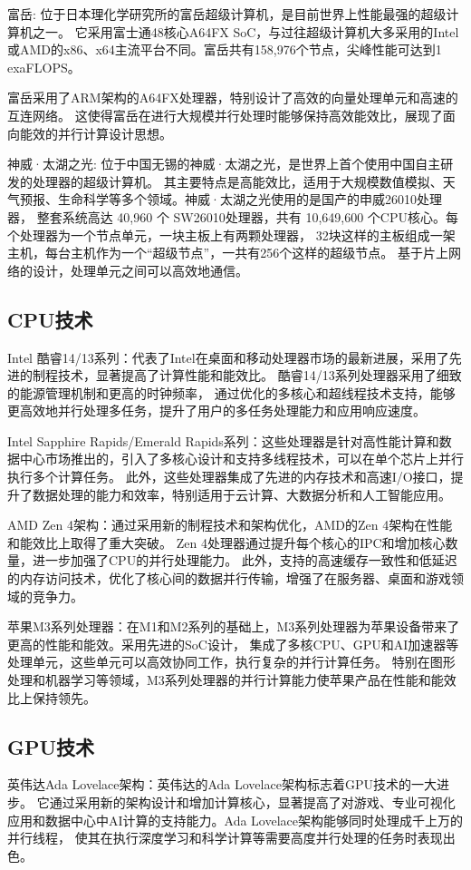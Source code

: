 \documentclass{ctexart}
\begin{document}
富岳: 位于日本理化学研究所的富岳超级计算机，是目前世界上性能最强的超级计算机之一。
它采用富士通48核心A64FX SoC，与过往超级计算机大多采用的Intel或AMD的x86、x64主流平台不同。富岳共有158,976个节点，尖峰性能可达到1 exaFLOPS。\cite{fugaku1}

富岳采用了ARM架构的A64FX处理器，特别设计了高效的向量处理单元和高速的互连网络。
这使得富岳在进行大规模并行处理时能够保持高效能效比，展现了面向能效的并行计算设计思想。

神威·太湖之光: 位于中国无锡的神威·太湖之光，是世界上首个使用中国自主研发的处理器的超级计算机。
其主要特点是高能效比，适用于大规模数值模拟、天气预报、生命科学等多个领域。神威·太湖之光使用的是国产的申威26010处理器，
整套系统高达 40,960 个 SW26010处理器，共有 10,649,600 个CPU核心。每个处理器为一个节点单元，一块主板上有两颗处理器，
32块这样的主板组成一架主机，每台主机作为一个“超级节点”，一共有256个这样的超级节点。 \cite{china93petaflop}
基于片上网络的设计，处理单元之间可以高效地通信。
\subsection{CPU技术}
Intel 酷睿14/13系列：代表了Intel在桌面和移动处理器市场的最新进展，采用了先进的制程技术，显著提高了计算性能和能效比。\cite{intelOfficial}
酷睿14/13系列处理器采用了细致的能源管理机制和更高的时钟频率，
通过优化的多核心和超线程技术支持，能够更高效地并行处理多任务，提升了用户的多任务处理能力和应用响应速度。

Intel Sapphire Rapids/Emerald Rapids系列：这些处理器是针对高性能计算和数据中心市场推出的，引入了多核心设计和支持多线程技术，可以在单个芯片上并行执行多个计算任务。
此外，这些处理器集成了先进的内存技术和高速I/O接口，提升了数据处理的能力和效率，特别适用于云计算、大数据分析和人工智能应用。\cite{intelOfficial}

AMD Zen 4架构：通过采用新的制程技术和架构优化，AMD的Zen 4架构在性能和能效比上取得了重大突破。
Zen 4处理器通过提升每个核心的IPC和增加核心数量，进一步加强了CPU的并行处理能力。\cite{amdOfficial}
此外，支持的高速缓存一致性和低延迟的内存访问技术，优化了核心间的数据并行传输，增强了在服务器、桌面和游戏领域的竞争力。

苹果M3系列处理器：在M1和M2系列的基础上，M3系列处理器为苹果设备带来了更高的性能和能效。采用先进的SoC设计，
集成了多核CPU、GPU和AI加速器等处理单元，这些单元可以高效协同工作，执行复杂的并行计算任务。
特别在图形处理和机器学习等领域，M3系列处理器的并行计算能力使苹果产品在性能和能效比上保持领先。
\subsection{GPU技术}
英伟达Ada Lovelace架构：英伟达的Ada Lovelace架构标志着GPU技术的一大进步。
它通过采用新的架构设计和增加计算核心，显著提高了对游戏、专业可视化应用和数据中心中AI计算的支持能力。Ada Lovelace架构能够同时处理成千上万的并行线程，
使其在执行深度学习和科学计算等需要高度并行处理的任务时表现出色。\cite{nvidiaOfficial}
\end{document}
